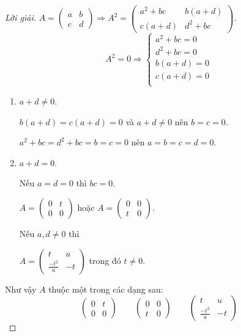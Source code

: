 \documentclass[class=linearalgebra,crop=false]{standalone}
\begin{document}
\begin{proof}[Lời giải]
    $A = \begin{pmatrix}a & b \\ c & d\end{pmatrix}\Rightarrow A^{2} = \begin{pmatrix}a^{2}+bc & b(a+d) \\ c(a+d) & d^{2}+bc\end{pmatrix}$.
    \[
        A^{2} = 0
        \Rightarrow
        \begin{cases}
            a^{2}+bc = 0 \\
            d^{2}+bc = 0 \\
            b(a + d) = 0 \\
            c(a + d) = 0 \\
        \end{cases}
    \]
    \begin{enumerate}[label = Trường hợp \arabic*:,itemindent=2cm]
        \item $a + d \ne 0$.
              \par $b(a+d) = c(a+d) = 0$ và $a+d\ne 0$ nên $b = c = 0$.
              \par $a^{2} + bc = d^{2} + bc = b = c = 0$ nên $a = b = c = d = 0$.
        \item $a + d = 0$.
              \par Nếu $a = d = 0$ thì $bc = 0$.
              \par $A = \begin{pmatrix}0 & t \\ 0 & 0\end{pmatrix}$ hoặc $A = \begin{pmatrix}0 & 0 \\ t & 0\end{pmatrix}$.
              \par Nếu $a, d\ne 0$ thì
              \par $A = \begin{pmatrix}t & u \\ \frac{-t^{2}}{u} & -t\end{pmatrix}$ trong đó $t \ne 0$.
    \end{enumerate}
    \par Như vậy $A$ thuộc một trong các dạng sau:
    \[
        \begin{pmatrix}
            0 & t \\
            0 & 0
        \end{pmatrix}
        \qquad
        \begin{pmatrix}
            0 & 0 \\
            t & 0
        \end{pmatrix}
        \qquad
        \begin{pmatrix}
            t                & u  \\
            \frac{-t^{2}}{u} & -t
        \end{pmatrix}
    \]
\end{proof}
\end{document}
